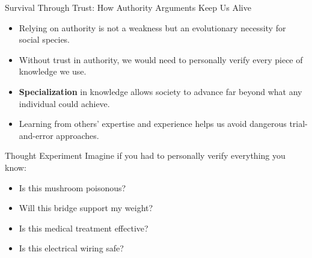 \documentclass{beamer}
\begin{document}
\begin{frame}{Survival Through Trust: How Authority Arguments Keep Us Alive}
    \begin{itemize}
        \item Relying on authority is not a weakness but an evolutionary necessity for social species.
        \item Without trust in authority, we would need to personally verify every piece of knowledge we use.
        \item \textbf{Specialization} in knowledge allows society to advance far beyond what any individual could achieve.
        \item Learning from others' expertise and experience helps us avoid dangerous trial-and-error approaches.
    \end{itemize}
    
    \begin{alertblock}{Thought Experiment}
        Imagine if you had to personally verify everything you know:
        \begin{itemize}
            \item Is this mushroom poisonous?
            \item Will this bridge support my weight?
            \item Is this medical treatment effective?
            \item Is this electrical wiring safe?
        \end{itemize}
    \end{alertblock}
\end{frame}
\end{document}
